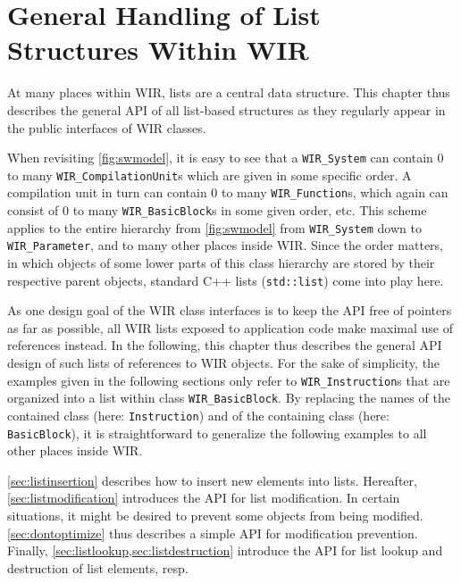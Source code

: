 \chapter{General Handling of List Structures Within WIR}
\label{chap:lists}
\renewcommand{\sectiontitle}{}

At many places within \gls{WIR}, lists are a central data structure.
This chapter thus describes the general \gls{API} of all list-based structures as they regularly appear in the public interfaces of \gls{WIR} classes.

When revisiting \cref{fig:swmodel}, it is easy to see that a \texttt{WIR\_System} can contain 0 to many \texttt{WIR\_CompilationUnit}s which are given in some specific order.
A compilation unit in turn can contain 0 to many \texttt{WIR\_Function}s, which again can consist of 0 to many \texttt{WIR\_BasicBlock}s in some given order, etc.
This scheme applies to the entire hierarchy from \cref{fig:swmodel} from \texttt{WIR\_System} down to \texttt{WIR\_Parameter}, and to many other places inside \gls{WIR}.
Since the order matters, in which objects of some lower parts of this class hierarchy are stored by their respective parent objects, standard C++ lists (\texttt{std::list}) come into play here.

As one design goal of the \gls{WIR} class interfaces is to keep the \gls{API} free of pointers as far as possible, all \gls{WIR} lists exposed to application code make maximal use of references instead.
In the following, this chapter thus describes the general \gls{API} design of such lists of references to \gls{WIR} objects.
For the sake of simplicity, the examples given in the following sections only refer to \texttt{WIR\_Instruction}s that are organized into a list within class \texttt{WIR\_BasicBlock}.
By replacing the names of the contained class (here: \texttt{Instruction}) and of the containing class (here: \texttt{BasicBlock}), it is straightforward to generalize the following examples to all other places inside \gls{WIR}.

\cref{sec:listinsertion} describes how to insert new elements into lists.
Hereafter, \cref{sec:listmodification} introduces the \gls{API} for list modification.
In certain situations, it might be desired to prevent some objects from being modified.
\cref{sec:dontoptimize} thus describes a simple \gls{API} for modification prevention.
Finally, \cref{sec:listlookup,sec:listdestruction} introduce the \gls{API} for list lookup and destruction of list elements, resp.


